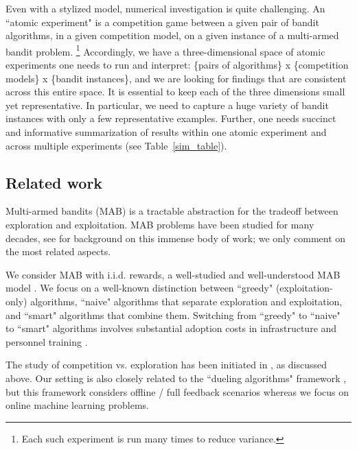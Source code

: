 \documentclass[../competing_bandits_with_appendix.tex]{subfiles}
\begin{document}
Even with a stylized model, numerical investigation is quite challenging. An ``atomic experiment" is a competition game between a given pair of bandit algorithms, in a given competition model, on a given instance of a multi-armed bandit problem.%
\footnote{Each such experiment is run many times to reduce variance.}
Accordingly, we have a three-dimensional space of atomic experiments one needs to run and interpret: \{pairs of algorithms\} x \{competition models\} x \{bandit instances\}, and we are looking for findings that are consistent across this entire space. It is essential to keep each of the three dimensions small yet representative. In particular, we need to capture a huge variety of bandit instances with only a few representative examples. Further, one needs succinct and informative summarization of results within one atomic experiment and across multiple experiments (\eg see Table~\ref{sim_table}).

\subsection{Related work}

 Multi-armed bandits (MAB) is a tractable abstraction for the tradeoff between exploration and exploitation. MAB problems have been studied for many decades, see \cite{Bubeck-survey12,LS19bandit-book} for background on this immense body of work; we only comment on the most related aspects.

We consider MAB with i.i.d. rewards, a well-studied and well-understood MAB model \cite{bandits-ucb1}. We focus on a well-known distinction between ``greedy" (exploitation-only) algorithms, ``naive" algorithms that separate exploration and exploitation, and ``smart" algorithms that combine them. Switching from ``greedy" to ``naive" to ``smart" algorithms involves substantial adoption costs in infrastructure and personnel training \cite{MWT-WhitePaper-2016,DS-arxiv}.

The study of competition vs. exploration has been initiated in \cite{CompetingBandits-itcs18}, as discussed above.
Our setting is also closely related to the ``dueling algorithms" framework \cite{DuelingAlgs-stoc11}, but this framework considers offline / full feedback scenarios whereas we focus on online machine learning problems.
\end{document}
